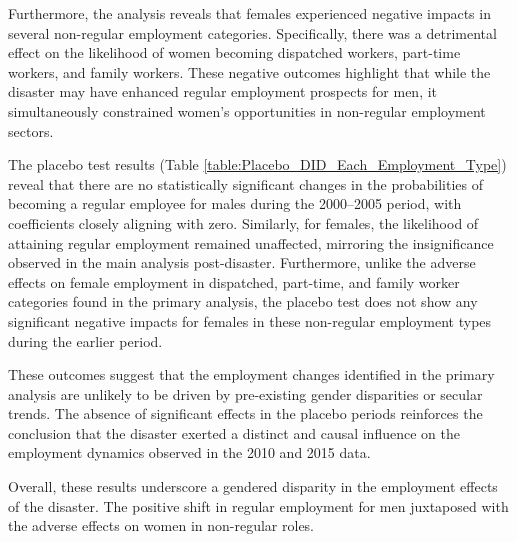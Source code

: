 \documentclass[a4paper,12pt]{article}
\begin{document}
Furthermore, the analysis reveals that females experienced negative impacts in several non-regular employment categories. Specifically, there was a detrimental effect on the likelihood of women becoming dispatched workers, part-time workers, and family workers. These negative outcomes highlight that while the disaster may have enhanced regular employment prospects for men, it simultaneously constrained women's opportunities in non-regular employment sectors.

The placebo test results (Table \ref{table:Placebo_DID_Each_Employment_Type}) reveal that there are no statistically significant changes in the probabilities of becoming a regular employee for males during the 2000–2005 period, with coefficients closely aligning with zero. Similarly, for females, the likelihood of attaining regular employment remained unaffected, mirroring the insignificance observed in the main analysis post-disaster. Furthermore, unlike the adverse effects on female employment in dispatched, part-time, and family worker categories found in the primary analysis, the placebo test does not show any significant negative impacts for females in these non-regular employment types during the earlier period.

These outcomes suggest that the employment changes identified in the primary analysis are unlikely to be driven by pre-existing gender disparities or secular trends. The absence of significant effects in the placebo periods reinforces the conclusion that the disaster exerted a distinct and causal influence on the employment dynamics observed in the 2010 and 2015 data. 

Overall, these results underscore a gendered disparity in the employment effects of the disaster. The positive shift in regular employment for men juxtaposed with the adverse effects on women in non-regular roles.
\end{document}
